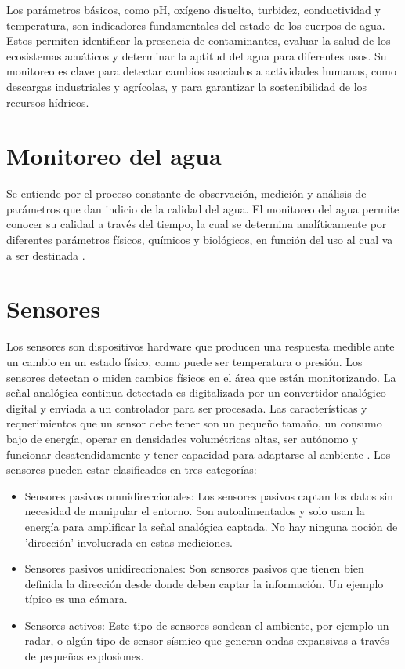 Los parámetros básicos, como pH, oxígeno disuelto, turbidez, conductividad y temperatura, son indicadores fundamentales del estado de los cuerpos de agua. Estos permiten identificar la presencia de contaminantes, evaluar la salud de los ecosistemas acuáticos y determinar la aptitud del agua para diferentes usos. Su monitoreo es clave para detectar cambios asociados a actividades humanas, como descargas industriales y agrícolas, y para garantizar la sostenibilidad de los recursos hídricos.

\section{Monitoreo del agua}
Se entiende por el proceso constante de observación, medición y análisis de parámetros que dan indicio de la calidad del agua. El monitoreo del agua permite conocer su calidad a través del tiempo, la cual se determina analíticamente por diferentes parámetros físicos, químicos y biológicos, en función del uso al cual va a ser destinada \cite{monitoreo2023}.


\section{Sensores}
Los sensores son dispositivos hardware que producen una respuesta medible ante un cambio en un estado
físico, como puede ser temperatura o presión. Los sensores detectan o miden cambios físicos en el área
que están monitorizando. La señal analógica continua detectada es digitalizada por un convertidor
analógico digital y enviada a un controlador para ser procesada.
Las características y requerimientos que un sensor debe tener son un pequeño tamaño, un consumo bajo
de energía, operar en densidades volumétricas altas, ser autónomo y funcionar desatendidamente y tener
capacidad para adaptarse al ambiente \cite{fernandez2009}.
Los sensores pueden estar clasificados en tres categorías:
\begin{itemize}
    \item Sensores pasivos omnidireccionales: Los sensores pasivos captan los datos sin necesidad de
manipular el entorno. Son autoalimentados y solo usan la energía para amplificar la señal
analógica captada. No hay ninguna noción de 'dirección' involucrada en estas mediciones.
    \item Sensores pasivos unidireccionales: Son sensores pasivos que tienen bien definida la dirección
desde donde deben captar la información. Un ejemplo típico es una cámara.
    \item Sensores activos: Este tipo de sensores sondean el ambiente, por ejemplo un radar, o algún tipo de sensor sísmico que generan ondas expansivas a través de pequeñas explosiones.
\end{itemize}


